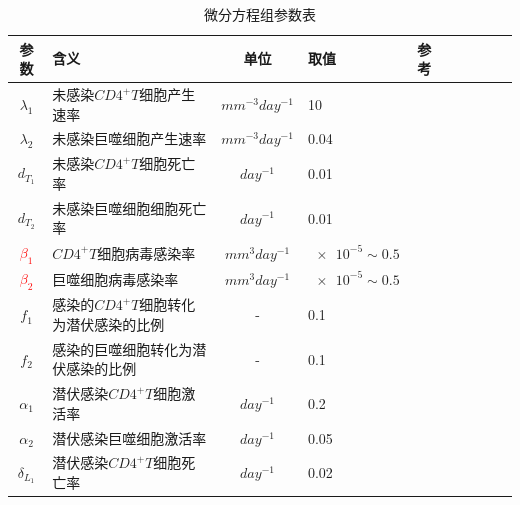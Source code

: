 \documentclass{ctexart}
\begin{document}
\begin{table}[H]
    \centering
    \caption{微分方程组参数表}
    \label{tab.1}
    \begin{tabular}{clclclclcl}
        \toprule
        参数                                                       & 含义                        & 单位                        & 取值                  & 参考        \\
        \midrule
        $\lambda _{1}$                                           & 未感染$CD4^{+}T$细胞产生速率       & $mm^{-3}day^{-1}$         & 10                  & \cite{4}  \\
        $\lambda _{2}$                                           & 未感染巨噬细胞产生速率               & $mm^{-3}day^{-1}$         & 0.04                & \cite{5}  \\
        $d_{T_{1}}$                                              & 未感染$CD4^{+}T$细胞死亡率        & $day^{-1}$                & 0.01                & \cite{4}  \\
        $d_{T_{2}}$                                              & 未感染巨噬细胞细胞死亡率              & $day^{-1}$                & 0.01                & \cite{5}  \\
        \textcolor{red}{$\beta_{1}$}                             & $CD4^{+}T$细胞病毒感染率         & $mm^{3}day^{-1}$          & $\num{e-5}\sim 0.5$ & \cite{7}  \\
        \textcolor{red}{$\beta_{2}$}                             & 巨噬细胞病毒感染率                 & $mm^{3}day^{-1}$          & $\num{e-5}\sim 0.5$ & \cite{7}  \\
        $f_{1}$                                                  & 感染的$CD4^{+}T$细胞转化为潜伏感染的比例 & -                         & 0.1                 & \cite{8}  \\
        $f_{2}$                                                  & 感染的巨噬细胞转化为潜伏感染的比例         & -                         & 0.1                 & \cite{8}  \\
        $\alpha_{1}$                                             & 潜伏感染$CD4^{+}T$细胞激活率       & $day^{-1}$                & 0.2                 & \cite{9}  \\
        $\alpha_{2}$                                             & 潜伏感染巨噬细胞激活率               & $day^{-1}$                & 0.05                & \cite{10} \\
        $\delta_{L_{1}}$                                         & 潜伏感染$CD4^{+}T$细胞死亡率       & $day^{-1}$                & 0.02                & \cite{10} \\

\end{tabular}
\end{table}
\end{document}
